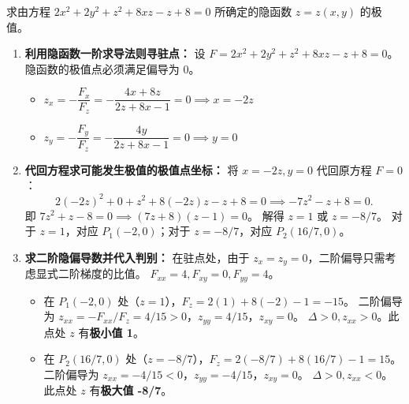 \documentclass[lang=cn,11pt]{elegantbook}
\begin{document}
\begin{exercise}[二阶曲面的隐函数极值一]
求由方程 $2x^2+2y^2+z^2+8xz-z+8=0$ 所确定的隐函数 $z=z(x,y)$ 的极值。
\end{exercise}
\begin{solution}
\begin{enumerate}
  \item \textbf{利用隐函数一阶求导法则寻驻点：}
  设 $F = 2x^2+2y^2+z^2+8xz-z+8 = 0$。隐函数的极值点必须满足偏导为 0。
  \begin{itemize}
    \item $z_x = -\dfrac{F_x}{F_z} = -\dfrac{4x+8z}{2z+8x-1} = 0 \implies x = -2z$
    \item $z_y = -\dfrac{F_y}{F_z} = -\dfrac{4y}{2z+8x-1} = 0 \implies y = 0$
  \end{itemize}

  \item \textbf{代回方程求可能发生极值的极值点坐标：}
  将 $x=-2z, y=0$ 代回原方程 $F=0$：
  \[ 2(-2z)^2 + 0 + z^2 + 8(-2z)z - z + 8 = 0 \implies -7z^2 - z + 8 = 0. \]
  即 $7z^2 + z - 8 = 0 \implies (7z+8)(z-1) = 0$。
  解得 $z=1$ 或 $z=-8/7$。
  对于 $z=1$，对应 $P_1(-2,0)$；对于 $z=-8/7$，对应 $P_2(16/7, 0)$。

  \item \textbf{求二阶隐偏导数并代入判别：}
  在驻点处，由于 $z_x = z_y = 0$，二阶偏导只需考虑显式二阶梯度的比值。
  $F_{xx} = 4, F_{xy} = 0, F_{yy} = 4$。
  \begin{itemize}
    \item 在 $P_1(-2,0)$ 处（$z=1$），$F_z = 2(1)+8(-2)-1 = -15$。
          二阶偏导为 $z_{xx} = -F_{xx}/F_z = 4/15 > 0$，$z_{yy} = 4/15$，$z_{xy} = 0$。
          $\Delta > 0, z_{xx} > 0$。此点处 $z$ 有\textbf{极小值 1}。
    \item 在 $P_2(16/7, 0)$ 处（$z=-8/7$），$F_z = 2(-8/7)+8(16/7)-1 = 15$。
          二阶偏导为 $z_{xx} = -4/15 < 0$，$z_{yy} = -4/15$，$z_{xy} = 0$。
          $\Delta > 0, z_{xx} < 0$。此点处 $z$ 有\textbf{极大值 -8/7}。
  \end{itemize}
\end{enumerate}
\end{solution}
\end{document}
